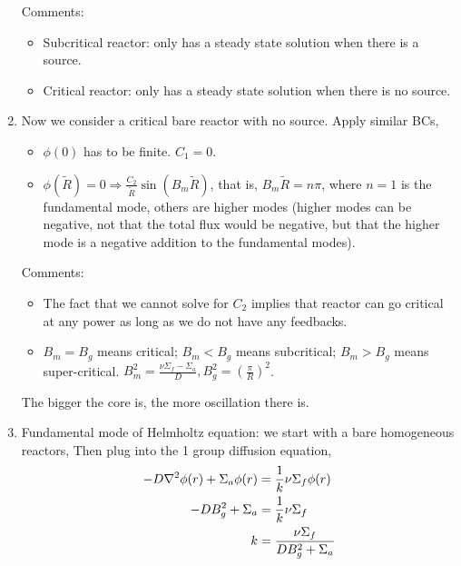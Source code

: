 \documentclass{school-22.211-notes}
\begin{document}
\begin{enumerate}
Comments:
\begin{itemize}
\item Subcritical reactor: only has a steady state solution when there is a source. 
\item Critical reactor: only has a steady state solution when there is no source. 
\end{itemize}


\item Now we consider a critical bare reactor with no source. 
Apply similar BCs, 
\begin{itemize}
  \item $\phi(0)$ has to be finite. $C_1 = 0$. 
  \item $\displaystyle  \phi(\tilde{R}) = 0 \Rightarrow \frac{C_2}{\tilde{R}} \sin (B_m \tilde{R} )$, that is, $B_m \tilde{R} = n \pi$, where $n = 1$ is the fundamental mode, others are higher modes (higher modes can be negative, not that the total flux would be negative, but that the higher mode is a negative addition to the fundamental modes). 
\end{itemize}
Comments:
\begin{itemize}
\item The fact that we cannot solve for $C_2$ implies that reactor can go critical at any power as long as we do not have any feedbacks.  
\item $B_m = B_g$ means critical; $B_m < B_g$ means subcritical; $B_m > B_g$ means super-critical. $B_m^2 = \frac{\nu \Sigma_f - \Sigma_a}{D}, B_g^2 = \left(\frac{\pi}{R} \right)^2$.  
\end{itemize}
The bigger the core is, the more oscillation there is. 

\item Fundamental mode of Helmholtz equation: we start with a bare homogeneous reactors, 
Then plug into the 1 group diffusion equation, 
\begin{align}
 - D \nabla^2 \phi(r) + \Sigma_a \phi(r) &= \frac{1}{k} \nu \Sigma_f \phi(r) \\
- D B_g^2 + \Sigma_a &= \frac{1}{k} \nu \Sigma_f \\
k &= \frac{\nu \Sigma_f}{DB_g^2 + \Sigma_a}  \label{k-sphere}
\end{align}



\end{enumerate}
\end{document}
